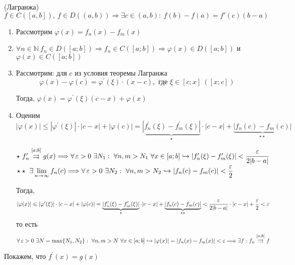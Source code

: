 \documentclass[a4paper, 10pt]{article}
\begin{document}
\theorem (Лагранжа) $f\in C([a,b]),\ f\in D((a, b))\Longrightarrow\exists c\in(a,b):\ f(b)-f(a)=f'(c)(b-a)$
\begin{enumerate}
    \item Рассмотрим $\varphi(x)=f_n(x)-f_m(x)$
    \item $\forall n\in\mathbb{N}\ f_n\in D([a;b])\Longrightarrow f_n\in C([a;b])\Longrightarrow \varphi(x)\in D([a;b])$ и $\varphi(x)\in C([a;b])$
    \item Рассмотрим: для $c$ из условия теоремы Лагранжа $$\varphi(x)-\varphi(c)=\varphi^{\prime}(\xi)\cdot(x-c),\text{ где }\xi\in[c;x]\ ([x;c])$$
    
    Тогда, $\varphi(x)=\varphi^{\prime}(\xi)(c-x)+\varphi(x)$ %
    \item Оценим $|\varphi(x)|\leqslant |\varphi^{\prime}(\xi)|\cdot|c-x|+|\varphi(c)|=\underbrace{|f^{\prime}_n(\xi)-f^{\prime}_m(\xi)|}_{\star}\cdot|c-x|+\underbrace{|f_n(c)-f_m(c)|}_{\star\star}$
    
    $\star\ f^{\prime}_n\overset{[a;b]}{\rightrightarrows}g(x)\Longrightarrow\forall\ve>0\ \exists N_1:\ \forall n,m>N_1\ \forall x\in[a;b]\hookrightarrow|f^{\prime}_n(\xi)-f^{\prime}_m(\xi)|<\displaystyle\frac{\ve}{2|b-a|}$\\
    $\star\star\ \exists\lim\limits_{n\to\infty}f_n(c)\Longrightarrow\forall\ve>0\ \exists N_2:\ \forall n,m>N_2\hookrightarrow|f_n(c)-f_m(c)|<\displaystyle\frac{\ve}{2}$

    Тогда,
    \begin{equation*}
        |\varphi(x)|\leqslant |\varphi^{\prime}(\xi)|\cdot|c-x|+|\varphi(c)|=\underbrace{|f^{\prime}_n(\xi)-f^{\prime}_m(\xi)|}_{\star}\cdot|c-x|+\underbrace{|f_n(c)-f_m(c)|}_{\star\star}<\frac{\operatorname{\varepsilon}}{2|b-a|}\cdot|c-x|+\frac{\operatorname{\varepsilon}}{2}<\operatorname{\varepsilon}
    \end{equation*}
    то есть
    \begin{equation*}
        \forall\operatorname{\varepsilon}>0\ \exists N=\max\{N_1,N_2\}:\ \forall n,m >N\ \forall x\in[a;b]\hookrightarrow|\varphi(x)|=|f_n(x)-f_m(x)|<\operatorname{\varepsilon}\Longrightarrow\exists f: f_n\overset{[a;b]}{\rightrightarrows}f
    \end{equation*}
\end{enumerate}

\proof Покажем, что $f^{\prime}(x)=g(x)$
\end{document}
